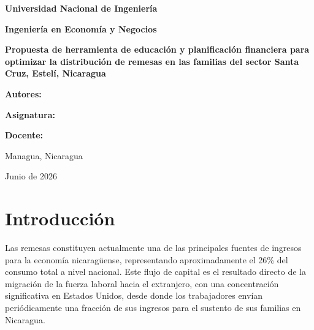 \documentclass[12pt,letterpaper]{article}
\begin{document}
\begin{titlepage}
\thispagestyle{fancy}
\centering
\vspace*{0.5in}

{\bfseries Universidad Nacional de Ingeniería\par}
\vspace{0.3cm}
{\bfseries Ingeniería en Economía y Negocios\par}
\vspace{1.3in}

{\bfseries\Large Propuesta de herramienta de educación y planificación financiera para optimizar la distribución de remesas en las familias del sector Santa Cruz, Estelí, Nicaragua\par}
\vspace{1.2in}

{\bfseries Autores:}\par
[Nombres de los integrantes]\par
\vspace{0.5cm}

{\bfseries Asignatura:}\par
[Nombre de la asignatura]\par
\vspace{0.5cm}

{\bfseries Docente:}\par
[Nombre del docente]\par
\vfill

Managua, Nicaragua\par
Junio de 2026\par

\end{titlepage}
\tableofcontents
\clearpage

\setcounter{page}{1}

\clearpage
\section{\texorpdfstring{\textbf{Introducción}}{Introducción}}\label{introducciuxf3n}

Las remesas constituyen actualmente una de las principales fuentes de ingresos para la economía nicaragüense, representando aproximadamente el 26\% del consumo total a nivel nacional. Este flujo de capital es el resultado directo de la migración de la fuerza laboral hacia el extranjero, con una concentración significativa en Estados Unidos, desde donde los trabajadores envían periódicamente una fracción de sus ingresos para el sustento de sus familias en Nicaragua.
\end{document}

